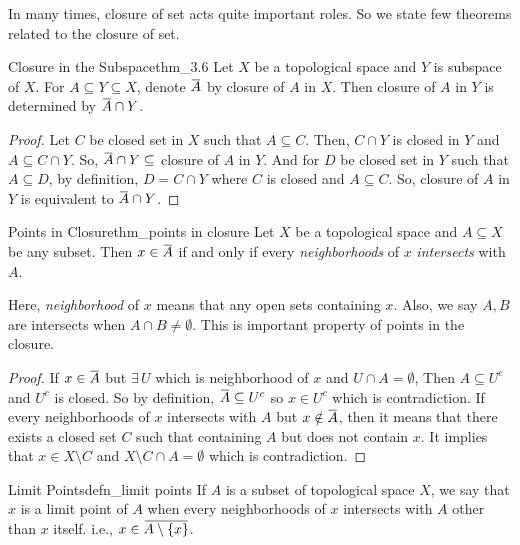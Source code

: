 \documentclass[12pt, a4paper, twoside]{article}
\newcommand{\overbar}[1]{\mkern 1.5mu\overline{\mkern-1.5mu#1\mkern-1.5mu}\mkern 1.5mu}
\theoremstyle{plain}
\begin{document}
In many times, closure of set acts quite important roles. So we state few theorems related to the closure of set. 

\begin{thm}{Closure in the Subspace}{thm_3.6}
    Let $X$ be a topological space and $Y$ is subspace of $X$. 
    For $A \subseteq Y \subseteq X$, denote $\overbar{A}$ by closure of $A$ in $X$. Then closure of $A$ in $Y$ is 
    determined by $\overbar{A} \cap Y$. 
\end{thm}

\begin{proof}
    Let $C$ be closed set in $X$ such that $A \subseteq C$. 
    Then, $C \cap Y$ is closed in $Y$ and $A \subseteq C \cap Y$. 
    So, $\overbar{A} \cap Y \subseteq$ closure of $A$ in $Y$. 
    And for $D$ be closed set in $Y$ such that $A \subseteq D$, 
    by definition, $D = C \cap Y$ where $C$ is closed and $A \subseteq C$. 
    So, closure of $A$ in $Y$ is equivalent to $\overbar{A} \cap Y$. 
\end{proof}

\begin{thm}{Points in Closure}{thm_points in closure}
    Let $X$ be a topological space and $A \subseteq X$ be any subset. 
    Then $x \in \overbar{A}$ if and only if every \textit{neighborhoods} of $x$ \textit{intersects} with $A$.
\end{thm}

Here, \textit{neighborhood} of $x$ means that any open sets containing $x$. Also, we say $A, B$ are intersects when $A \cap B \neq \emptyset$. 
This is important property of points in the closure. 

\begin{proof}
    If $x \in \overbar{A}$ but $\exists \, U$ which is neighborhood of $x$ and $U \cap A = \emptyset$, 
    Then $A \subseteq U^c$ and $U^c$ is closed. So by definition, $\overbar{A} \subseteq U^c$ so $x \in U^c$ which is contradiction. 
    If every neighborhoods of $x$ intersects with $A$ but $x \notin \overbar{A}$, 
    then it means that there exists a closed set $C$ such that containing $A$ but does not contain $x$.
    It implies that $x \in X \setminus C$ and $X \setminus C \cap A = \emptyset$ which is contradiction. 
\end{proof}

\begin{defn}{Limit Points}{defn_limit points}
    If $A$ is a subset of topological space $X$, we say that $x$ is a limit point of $A$ when 
    every neighborhoods of $x$ intersects with $A$ other than $x$ itself. i.e., $x \in \overbar{A \setminus \{x\}}$. 
\end{defn}
\end{document}
